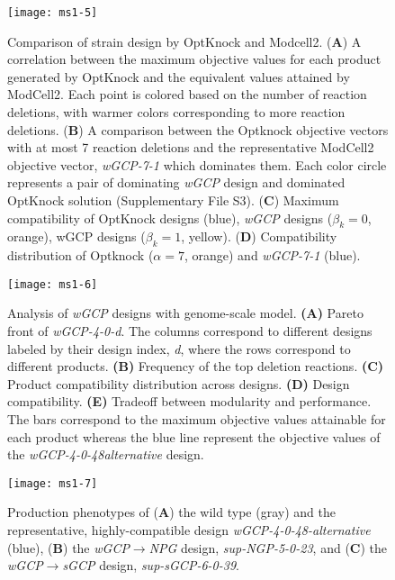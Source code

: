 \begin{figure}[h]
  \centering
  \texttt{[image: ms1-5]}
    \caption[Comparison of strain design by OptKnock and Modcell2]{
Comparison of strain design by OptKnock and Modcell2.
(\textbf{A}) A correlation between the maximum objective values for each
product generated by OptKnock and the equivalent values attained by
ModCell2. Each point is colored based on the number of reaction
deletions, with warmer colors corresponding to more reaction deletions.
(\textbf{B}) A comparison between the Optknock objective vectors with at
most 7 reaction deletions and the representative ModCell2 objective
vector, \emph{wGCP-7-1} which dominates them. Each color circle
represents a pair of dominating \emph{wGCP} design and dominated
OptKnock solution (Supplementary File S3). (\textbf{C}) Maximum
compatibility of OptKnock designs (blue), \emph{wGCP} designs
    ($\beta_k=0$, orange), wGCP designs ($\beta_k = 1$,
yellow). (\textbf{D}) Compatibility distribution of Optknock ($\alpha = 7$,
orange) and \emph{wGCP-7-1} (blue).
    }
    \label{fig:ms1-fig5}
\end{figure}

\begin{figure}[h]
  \centering
  \texttt{[image: ms1-6]}
    \caption[Analysis of \emph{wGCP} designs with genome-scale model]{
 Analysis of \emph{wGCP} designs with genome-scale model. \textbf{(A)} Pareto front of \emph{wGCP-4-0-d}. The
columns correspond to different designs labeled by their design index,
\emph{d}, where the rows correspond to different products. \textbf{(B)}
Frequency of the top deletion reactions. \textbf{(C)} Product
    compatibility distribution across designs. \textbf{(D)} Design
compatibility. \textbf{(E)} Tradeoff between modularity and performance.
The bars correspond to the maximum objective values attainable for each
product whereas the blue line represent the objective values of the
\emph{wGCP-4-0-48alternative} design.
    }
    \label{fig:ms1-fig6}
\end{figure}

\begin{figure}[h]
  \centering
  \texttt{[image: ms1-7]}
    \caption[Production phenotypes of proposed designs]{
Production phenotypes of (\textbf{A}) the wild type
(gray) and the representative, highly-compatible design
\emph{wGCP-4-0-48-alternative} (blue), (\textbf{B}) the
\emph{wGCP}$\rightarrow$\emph{NPG} design, \emph{sup-NGP-5-0-23}, and (\textbf{C})
the \emph{wGCP}$\rightarrow$\emph{sGCP} design, \emph{sup-sGCP-6-0-39}.
    }
    \label{fig:ms1-fig7}
\end{figure}

